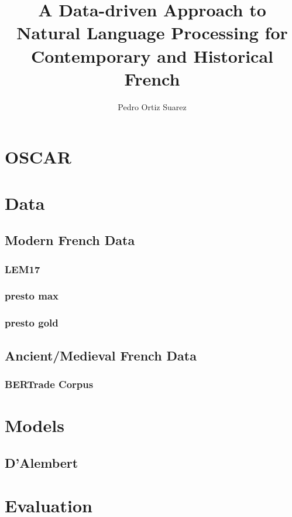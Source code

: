 \documentclass{mimosis}
\title{A Data-driven Approach to Natural Language Processing for Contemporary and Historical French}
\author{Pedro Ortiz Suarez}
\begin{document}
\frontmatter



\tableofcontents

\mainmatter



\part{OSCAR}






\part{Data}

\chapter{Modern French Data}
\section{LEM17}
\section{presto max}
\section{presto gold}
\chapter{Ancient/Medieval French Data}
\section{BERTrade Corpus}

\part{Models}


\chapter{D'Alembert}


\part{Evaluation}

\end{document}
